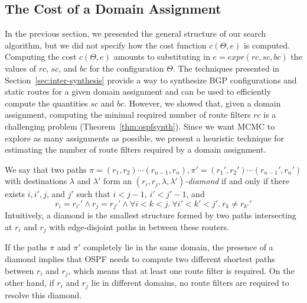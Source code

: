 \subsection{The Cost of a Domain Assignment}
\label{sec:cost-fun}
In the previous section, we presented the general structure of our search algorithm,
but we did not specify how the cost function $c(\Theta,e)$
is computed. 
Computing the cost $c(\Theta,e)$ amounts to substituting in $e=expr(rc, sc, bc)$
the values of $rc$,
$sc$, and $bc$ for the configuration $\Theta$.
The techniques presented in Section~\ref{sec:inter-synthesis} provide a way to 
synthesize BGP configurations and static routes for a given domain assignment
and can be used to 
efficiently compute the quantities $sc$ and $bc$.
However, we showed that, given a domain assignment, computing the  minimal required number of route filters $rc$
is a challenging problem (Theorem~\ref{thm:ospfsynth}).
Since we want MCMC to explore as many assignments as possible,
we present a heuristic technique for estimating the number of route filters required by a domain assignment. 

We say that two paths $\pi=(r_1,r_2)\cdots (r_{n-1},r_n), \pi'=(r_1',r_2')\cdots (r_{n-1}',r_n')$ with destinations $\lambda$ and $\lambda'$
form an $(r_i, r_j, \lambda, \lambda')$\emph{-diamond} if and only if
there exists $i,i',j$, and $j'$ such that $i<j-1$, $i'<j'-1$, and
\[
r_i{=}r_{i'}' \wedge  r_j{=}r_{j'}' \wedge  \forall i{<}k{<}j.~\forall i'{<}k'{<}j'.~r_{k}{\neq} r_{k'}'  
\]
Intuitively, a diamond is the smallest structure formed by two
paths intersecting at $r_i$ and $r_j$ with edge-disjoint paths in 
between these routers. 

If the paths $\pi$ and $\pi'$ completely lie in the same domain,
the presence of a diamond 
implies that OSPF needs to compute two different shortest paths between $r_i$ and $r_j$, 
which means that
at least one route filter is required.
On the other hand, if $r_i$ and $r_j$ lie in
different domains, no route filters are required to resolve this diamond. 




